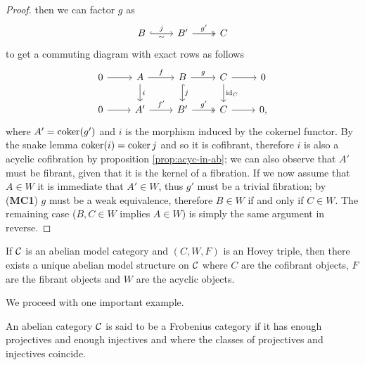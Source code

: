 \begin{proof}
	then we can factor $g$ as 
	\[\begin{tikzcd}
		B & {B'} & C
		\arrow["j", "\sim"', hook, from=1-1, to=1-2]
		\arrow["{g'}", two heads, from=1-2, to=1-3]
	\end{tikzcd}\]
	to get a commuting diagram with exact rows as follows
	\[\begin{tikzcd}
		0 & A & B & C & 0 \\
		0 & {A'} & {B'} & C & {0,}
		\arrow[from=1-1, to=1-2]
		\arrow["f", from=1-2, to=1-3]
		\arrow["i", from=1-2, to=2-2]
		\arrow["g", from=1-3, to=1-4]
		\arrow["j", hook, from=1-3, to=2-3]
		\arrow[from=1-4, to=1-5]
		\arrow["{{\id_C}}", from=1-4, to=2-4]
		\arrow[from=2-1, to=2-2]
		\arrow["{{f'}}", from=2-2, to=2-3]
		\arrow["{{g'}}", two heads, from=2-3, to=2-4]
		\arrow[from=2-4, to=2-5]
	\end{tikzcd}\]
	where $A' = \operatorname{coker}(g')$ and $i$ is the morphism induced by the cokernel functor. By the snake lemma $\operatorname{coker}(i) = \operatorname{coker}{j}$ and so it is cofibrant, therefore $i$ is also a acyclic cofibration by proposition \ref{prop:acyc-in-ab}; we can also observe that $A'$ must be fibrant, given that it is the kernel of a fibration. If we now assume that $A \in W$ it is immediate that $A' \in W$, thus $g'$ must be a trivial fibration; by (\textbf{MC1}) $g$ must be a weak equivalence, therefore $B\in W$ if and only if $C\in W$. The remaining case ($B,C \in W$ implies $A\in W$) is simply the same argument in reverse. 
\end{proof}








\begin{theorem}
	If $\mathcal{C}$ is an abelian model category and $(C,W,F)$ is an Hovey triple, then there exists a unique abelian model structure on $\mathcal{C}$ where $C$ are the cofibrant objects, $F$ are the fibrant objects and $W$ are the acyclic objects.
\end{theorem}





We proceed with one important example.

\begin{definition}
	An abelian category $\mathcal{C}$ is said to be a Frobenius category if it has enough projectives and enough injectives and where the classes of projectives and injectives coincide.
\end{definition}


